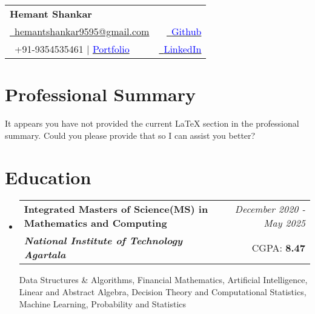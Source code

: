 \documentclass[a4paper,11pt]{article}
\makeatletter
\newcommand{\resumeSubheading}[4]{
\vspace{0.5mm}\item
    \begin{tabular*}{0.98\textwidth}[t]{l@{\extracolsep{\fill}}r}
        \textbf{#1} & \textit{\footnotesize{#4}} \\
        \textit{\footnotesize{#3}} &  \footnotesize{#2}\\
    \end{tabular*}
    \vspace{-2.4mm}
}
\newcommand{\resumeSubHeadingListStart}{\begin{itemize}[leftmargin=*,labelsep=0mm]}
\newcommand{\resumeSubHeadingListEnd}{\end{itemize}\vspace{2mm}}
\newcommand{\name}{Hemant Shankar} %
\newcommand{\phone}{9354535461 | \href{https://hemant-shankar-portfolio.onrender.com/}{\textcolor{blue}{Portfolio}}} %
\newcommand{\emaila}{hemantshankar9595@gmail.com} %
\makeatother
\begin{document}
\selectfont

{
\begin{tabularx}{\linewidth}{L r} \\
  \textbf{\Large \name}\\
  \href{mailto:hemantshankar9595@gmail.com}{\raisebox{0.0\height}{\footnotesize \faEnvelope}\ {\emaila}} & \href{https://github.com/HemantShankar}{\raisebox{0.0\height}{\footnotesize \faGithub}\ {\textcolor{blue}{Github}}} \\  
  {\raisebox{0.0\height}{\footnotesize \faPhone}\ +91-\phone} & \href{https://www.linkedin.com/in/hemant-shankar}{\raisebox{0.0\height}{\footnotesize \faLinkedin}\ {\textcolor{blue}{LinkedIn}}}
\end{tabularx}
}
\vspace{-4mm}
\section{\textbf{Professional Summary}}
It appears you have not provided the current LaTeX section in the professional summary. Could you please provide that so I can assist you better?
\section{\textbf{Education}}
  \resumeSubHeadingListStart
    \resumeSubheading
      { Integrated Masters of Science(MS) in Mathematics and Computing}{CGPA: \textbf{8.47}}
      {\textbf{National Institute of Technology Agartala}}{December 2020 - May 2025}
      \vspace{0.3cm}
      \small Data Structures \& Algorithms, Financial Mathematics, Artificial Intelligence, Linear and
Abstract Algebra, Decision Theory and
Computational Statistics, Machine Learning, 
Probability and Statistics
  \resumeSubHeadingListEnd
\vspace{-8.0mm}
%

\end{document}
